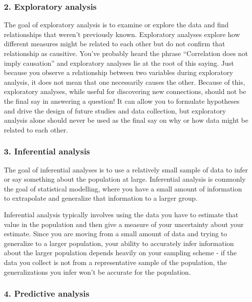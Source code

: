 \documentclass[
]{book}
\begin{document}
\hypertarget{exploratory-analysis}{%
\subsubsection{2. Exploratory analysis}\label{exploratory-analysis}}

The goal of exploratory analysis is to examine or explore the data and find relationships that weren't previously known. Exploratory analyses explore how different measures might be related to each other but do not confirm that relationship as causitive. You've probably heard the phrase ``Correlation does not imply causation'' and exploratory analyses lie at the root of this saying. Just because you observe a relationship between two variables during exploratory analysis, it does not mean that one necessarily causes the other.
Because of this, exploratory analyses, while useful for discovering new connections, should not be the final say in answering a question! It can allow you to formulate hypotheses and drive the design of future studies and data collection, but exploratory analysis alone should never be used as the final say on why or how data might be related to each other.

\hypertarget{inferential-analysis}{%
\subsubsection{3. Inferential analysis}\label{inferential-analysis}}

The goal of inferential analyses is to use a relatively small sample of data to infer or say something about the population at large. Inferential analysis is commonly the goal of statistical modelling, where you have a small amount of information to extrapolate and generalize that information to a larger group.

Inferential analysis typically involves using the data you have to estimate that value in the population and then give a measure of your uncertainty about your estimate. Since you are moving from a small amount of data and trying to generalize to a larger population, your ability to accurately infer information about the larger population depends heavily on your sampling scheme - if the data you collect is not from a representative sample of the population, the generalizations you infer won't be accurate for the population.

\hypertarget{predictive-analysis}{%
\subsubsection{4. Predictive analysis}\label{predictive-analysis}}
\end{document}

